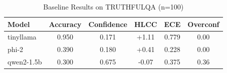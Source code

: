 \begin{table}[h]
\centering
\caption{Baseline Results on TRUTHFULQA (n=100)}
\begin{tabular}{lccccc}
\toprule
Model & Accuracy & Confidence & HLCC & ECE & Overconf \\
\midrule
tinyllama & 0.950 & 0.171 & +1.11 & 0.779 & 0.00 \\
phi-2 & 0.390 & 0.180 & +0.41 & 0.228 & 0.00 \\
qwen2-1.5b & 0.300 & 0.675 & -0.07 & 0.375 & 0.36 \\
\bottomrule
\end{tabular}
\label{tab:baseline_truthfulqa}
\end{table}